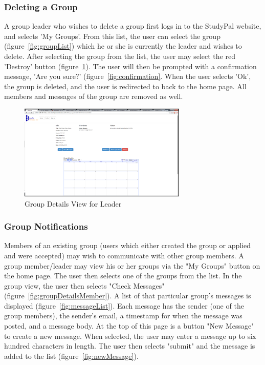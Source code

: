 \documentclass[conference]{IEEEtran}
\begin{document}
\subsubsection{Deleting a Group}
A group leader who wishes to delete a group first logs in to the StudyPal website, and selects 'My Groups'.  From this list, the user can select the group (figure~\ref{fig:groupList}) which he or she is currently the leader and wishes to delete.  After selecting the group from the list, the user may select the red 'Destroy' button (figure~\ref{fig:groupDetailsLeader}).  The user will then be prompted with a confirmation message, 'Are you sure?' (figure~\ref{fig:confirmation}.  When the user selects 'Ok', the group is deleted, and the user is redirected to back to the home page.  All members and messages of the group are removed as well.

\begin{figure}[ht!]
\centering
\includegraphics[width=80mm]{figures/groupDetailsLeader}
\caption{Group Details View for Leader \label{fig:groupDetailsLeader}}
\end{figure}

\subsubsection{Group Notifications}

Members of an existing group (users which either created the group or applied and were accepted) may wish to communicate with other group members.  A group member/leader may view his or her groups via the "My Groups" button on the home page.  The user then selects one of the groups from the list.  In the group view, the user then selects "Check Messages" (figure~\ref{fig:groupDetailsMember}).  A list of that particular group's messages is displayed (figure~\ref{fig:messageList}).  Each message has the sender (one of the group members), the sender's email, a timestamp for when the message was posted, and a message body.  At the top of this page is a button "New Message" to create a new message.  When selected, the user may enter a message up to six hundred characters in length.  The user then selects "submit" and the message is added to the list (figure~\ref{fig:newMessage}).  
\end{document}
